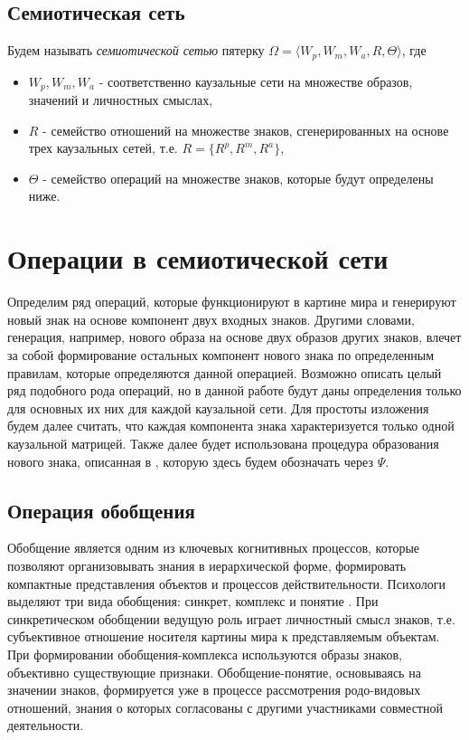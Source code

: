\documentclass[12pt]{scrartcl}
\begin{document}
	\subsection{Семиотическая сеть}
	Будем называть \textit{семиотической сетью} пятерку $\Omega=\langle W_p, W_m, W_a, R, \Theta \rangle$, где
	\begin{itemize}
		\item $W_p, W_m, W_a$ - соответственно каузальные сети на множестве образов, значений и личностных смыслах,
		\item $R$ - семейство отношений на множестве знаков, сгенерированных на основе трех каузальных сетей, т.е. $R=\{R^p, R^m, R^a\}$,
		\item $\Theta$ - семейство операций на множестве знаков, которые будут определены ниже.
	\end{itemize} 
	

	\section{Операции в семиотической сети}
	Определим ряд операций, которые функционируют в картине мира и генерируют новый знак на основе компонент двух входных знаков. Другими словами, генерация, например, нового образа на основе двух образов других знаков, влечет за собой формирование остальных компонент нового знака по определенным правилам, которые определяются данной операцией. Возможно описать целый ряд подобного рода операций, но в данной работе будут даны определения только для основных их них для каждой каузальной сети. Для простоты изложения будем далее считать, что каждая компонента знака характеризуется только одной каузальной матрицей. Также далее будет использована процедура образования нового знака, описанная в \cite{Osipov2014c}, которую здесь будем обозначать через $\Psi$.
	
	\subsection{Операция обобщения}
	
	Обобщение является одним из ключевых когнитивных процессов, которые позволяют организовывать знания в иерархической форме, формировать компактные представления объектов и процессов действительности. Психологи выделяют три вида обобщения: синкрет, комплекс и понятие \cite{Vygotsky1999}. При синкретическом обобщении ведущую роль играет личностный смысл знаков, т.е. субъективное отношение носителя картины мира к представляемым объектам. При формировании обобщения-комплекса используются образы знаков, объективно существующие признаки. Обобщение-понятие, основываясь на значении знаков, формируется уже в процессе рассмотрения родо-видовых отношений, знания о которых согласованы с другими участниками совместной деятельности.
	
\end{document}
